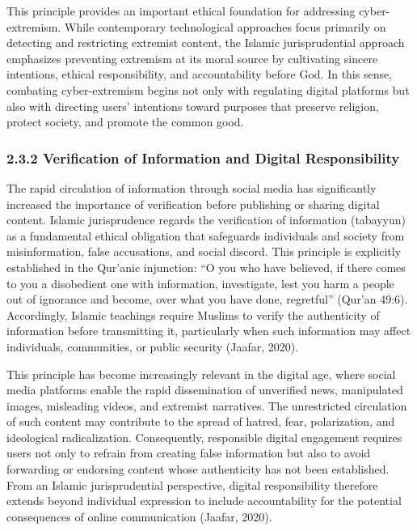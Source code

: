 \documentclass[10pt]{NSP1}
\begin{document}
	This principle provides an important ethical foundation for addressing cyber-extremism. While contemporary technological approaches focus primarily on detecting and restricting extremist content, the Islamic jurisprudential approach emphasizes preventing extremism at its moral source by cultivating sincere intentions, ethical responsibility, and accountability before God. In this sense, combating cyber-extremism begins not only with regulating digital platforms but also with directing users' intentions toward purposes that preserve religion, protect society, and promote the common good.
	
	\subsubsection*{2.3.2 Verification of Information and Digital Responsibility}
	
	The rapid circulation of information through social media has significantly increased the importance of verification before publishing or sharing digital content. Islamic jurisprudence regards the verification of information (tabayyun) as a fundamental ethical obligation that safeguards individuals and society from misinformation, false accusations, and social discord. This principle is explicitly established in the Qur'anic injunction: ``O you who have believed, if there comes to you a disobedient one with information, investigate, lest you harm a people out of ignorance and become, over what you have done, regretful'' (Qur'an 49:6). Accordingly, Islamic teachings require Muslims to verify the authenticity of information before transmitting it, particularly when such information may affect individuals, communities, or public security (Jaafar, 2020).
	
	This principle has become increasingly relevant in the digital age, where social media platforms enable the rapid dissemination of unverified news, manipulated images, misleading videos, and extremist narratives. The unrestricted circulation of such content may contribute to the spread of hatred, fear, polarization, and ideological radicalization. Consequently, responsible digital engagement requires users not only to refrain from creating false information but also to avoid forwarding or endorsing content whose authenticity has not been established. From an Islamic jurisprudential perspective, digital responsibility therefore extends beyond individual expression to include accountability for the potential consequences of online communication (Jaafar, 2020).
	
\end{document}
